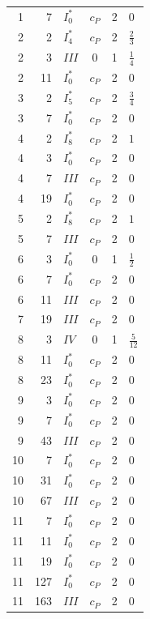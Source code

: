 \begin{proposition}
\begin{longtable}{r r l c c l}
1 & 7 & $I_0^*$ & $c_P$ & 2 & $0$\\
2 & 2 & $I_{4}^*$ & $c_P$ & 2 & $\frac{2}{3}$\\
2 & 3 & $III$ & $0$ & 1 & $\frac{1}{4}$\\
2 & 11 & $I_0^*$ & $c_P$ & 2 & $0$\\
3 & 2 & $I_{5}^*$ & $c_P$ & 2 & $\frac{3}{4}$\\
3 & 7 & $I_0^*$ & $c_P$ & 2 & $0$\\
4 & 2 & $I_{8}^*$ & $c_P$ & 2 & $1$\\
4 & 3 & $I_0^*$ & $c_P$ & 2 & $0$\\
4 & 7 & $III$ & $c_P$ & 2 & $0$\\
4 & 19 & $I_0^*$ & $c_P$ & 2 & $0$\\
5 & 2 & $I_{8}^*$ & $c_P$ & 2 & $1$\\
5 & 7 & $III$ & $c_P$ & 2 & $0$\\
6 & 3 & $I_0^*$ & $0$ & 1 & $\frac{1}{2}$\\
6 & 7 & $I_0^*$ & $c_P$ & 2 & $0$\\
6 & 11 & $III$ & $c_P$ & 2 & $0$\\
7 & 19 & $III$ & $c_P$ & 2 & $0$\\
8 & 3 & $IV$ & $0$ & 1 & $\frac{5}{12}$\\
8 & 11 & $I_0^*$ & $c_P$ & 2 & $0$\\
8 & 23 & $I_0^*$ & $c_P$ & 2 & $0$\\
9 & 3 & $I_0^*$ & $c_P$ & 2 & $0$\\
9 & 7 & $I_0^*$ & $c_P$ & 2 & $0$\\
9 & 43 & $III$ & $c_P$ & 2 & $0$\\
10 & 7 & $I_0^*$ & $c_P$ & 2 & $0$\\
10 & 31 & $I_0^*$ & $c_P$ & 2 & $0$\\
10 & 67 & $III$ & $c_P$ & 2 & $0$\\
11 & 7 & $I_0^*$ & $c_P$ & 2 & $0$\\
11 & 11 & $I_0^*$ & $c_P$ & 2 & $0$\\
11 & 19 & $I_0^*$ & $c_P$ & 2 & $0$\\
11 & 127 & $I_0^*$ & $c_P$ & 2 & $0$\\
11 & 163 & $III$ & $c_P$ & 2 & $0$\\
\bottomrule\end{longtable}
\endgroup
\end{proposition}


